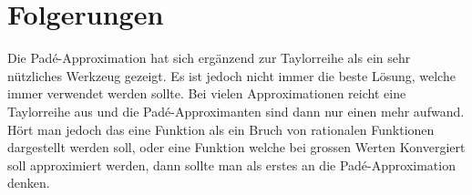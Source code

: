 %
%
%
\section{Folgerungen
\label{pade:section:folgerungen}}
Die Padé-Approximation hat sich ergänzend zur Taylorreihe als ein sehr nützliches Werkzeug gezeigt.
Es ist jedoch nicht immer die beste Lösung, welche immer verwendet werden sollte.
Bei vielen Approximationen reicht eine Taylorreihe aus und die Padé-Approximanten sind dann nur einen mehr aufwand.
Hört man jedoch das eine Funktion als ein Bruch von rationalen Funktionen dargestellt werden soll, oder eine Funktion welche bei grossen Werten Konvergiert soll approximiert werden, dann sollte man als erstes an die Padé-Approximation denken.




